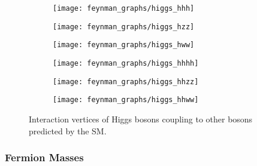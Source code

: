 \begin{figure}[htbp]
  \centering

  \begin{subfigure}{0.33\textwidth}
    \centering
    \texttt{[image: feynman\_graphs/higgs\_hhh]}
    \subcaption{}
    \label{fig:vertex_hhh}
  \end{subfigure}%
  \begin{subfigure}{0.33\textwidth}
    \centering
    \texttt{[image: feynman\_graphs/higgs\_hzz]}
    \subcaption{}
  \end{subfigure}%
  \begin{subfigure}{0.33\textwidth}
    \centering
    \texttt{[image: feynman\_graphs/higgs\_hww]}
    \subcaption{}
  \end{subfigure}

  \vspace{1em}

  \begin{subfigure}{0.33\textwidth}
    \centering
    \texttt{[image: feynman\_graphs/higgs\_hhhh]}
    \subcaption{}
    \label{fig:vertex_hhhh}
  \end{subfigure}%
  \begin{subfigure}{0.33\textwidth}
    \centering
    \texttt{[image: feynman\_graphs/higgs\_hhzz]}
    \subcaption{}
  \end{subfigure}%
  \begin{subfigure}{0.33\textwidth}
    \centering
    \texttt{[image: feynman\_graphs/higgs\_hhww]}
    \subcaption{}
  \end{subfigure}

  \caption{Interaction vertices of Higgs bosons coupling to other bosons
    predicted by the SM.}%
  \label{fig:higgs_vertices}
\end{figure}




\subsubsection{Fermion Masses}

